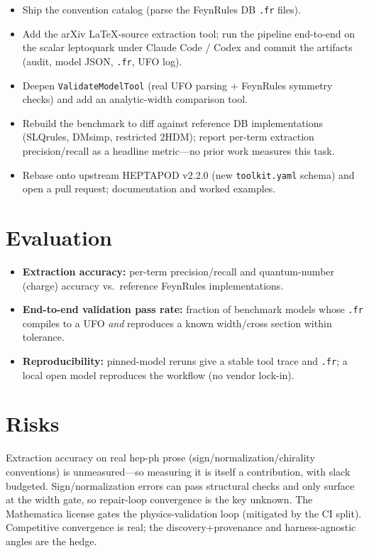 \documentclass[11pt]{article}
\newcommand{\code}[1]{\texttt{#1}}
\begin{document}
\begin{itemize}
  \item Ship the convention catalog (parse the FeynRules DB \code{.fr} files).
  \item Add the arXiv LaTeX-source extraction tool; run the pipeline end-to-end
  on the scalar leptoquark under Claude Code / Codex and commit the artifacts
  (audit, model JSON, \code{.fr}, UFO log).
  \item Deepen \code{ValidateModelTool} (real UFO parsing $+$ FeynRules symmetry
  checks) and add an analytic-width comparison tool.
  \item Rebuild the benchmark to diff against reference DB implementations
  (SLQrules, DMsimp, restricted 2HDM); report per-term extraction
  precision/recall as a headline metric---no prior work measures this task.
  \item Rebase onto upstream HEPTAPOD v2.2.0 (new \code{toolkit.yaml} schema) and
  open a pull request; documentation and worked examples.
\end{itemize}

\section{Evaluation}

\begin{itemize}
  \item \textbf{Extraction accuracy:} per-term precision/recall and
  quantum-number (charge) accuracy vs.\ reference FeynRules implementations.
  \item \textbf{End-to-end validation pass rate:} fraction of benchmark models
  whose \code{.fr} compiles to a UFO \emph{and} reproduces a known width/cross
  section within tolerance.
  \item \textbf{Reproducibility:} pinned-model reruns give a stable tool trace
  and \code{.fr}; a local open model reproduces the workflow (no vendor lock-in).
\end{itemize}

\section{Risks}

Extraction accuracy on real hep-ph prose (sign/normalization/chirality
conventions) is unmeasured---so measuring it is itself a contribution, with slack
budgeted. Sign/normalization errors can pass structural checks and only surface
at the width gate, so repair-loop convergence is the key unknown. The Mathematica
license gates the physics-validation loop (mitigated by the CI split).
Competitive convergence is real; the discovery+provenance and harness-agnostic
angles are the hedge.
\end{document}
